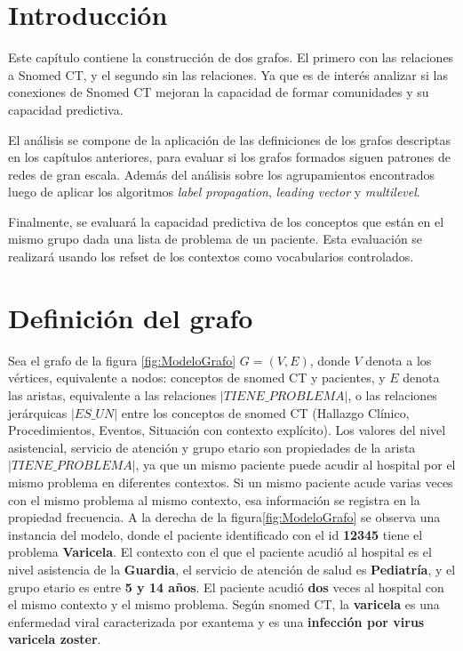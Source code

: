 \section{Introducción}
Este capítulo contiene la construcción de dos grafos. El primero con las relaciones a Snomed CT, y el segundo sin las relaciones. Ya que es de interés analizar si las conexiones de Snomed CT mejoran la capacidad de formar comunidades y su capacidad predictiva.

El análisis se compone de la aplicación de las definiciones de los grafos descriptas en los capítulos anteriores, para evaluar si los grafos formados siguen patrones de redes de gran escala. Además del análisis sobre los agrupamientos encontrados luego de aplicar los algoritmos \textit{label propagation}, \textit{leading vector} y \textit{multilevel}. 

Finalmente, se evaluará la capacidad predictiva de los conceptos que están en el mismo grupo dada una lista de problema de un paciente. Esta evaluación se realizará usando los {\acrshort{refset}} de los contextos como vocabularios controlados.

\section{Definición del grafo}
Sea el grafo de la figura \ref{fig:ModeloGrafo} $G=(V,E)$, donde $V$ denota a los vértices, equivalente a nodos: conceptos de snomed CT y pacientes, y $E$ denota las aristas, equivalente a las relaciones $|\textit{TIENE\_PROBLEMA}|$, o las relaciones jerárquicas $|\textit{ES\_UN}|$ entre los conceptos de snomed CT (Hallazgo Clínico, Procedimientos, Eventos, Situación con contexto explícito). Los valores del nivel asistencial, servicio de atención  y grupo etario son propiedades de la arista $|\textit{TIENE\_PROBLEMA}|$, ya que un mismo paciente puede acudir al hospital por el mismo problema en diferentes contextos.  Si un mismo paciente acude varias veces con el mismo problema al mismo contexto, esa información se registra en la propiedad frecuencia. A la derecha de la figura\ref{fig:ModeloGrafo} se observa una instancia del modelo, donde el paciente identificado con el id \textbf{12345} tiene el problema \textbf{Varicela}. El contexto con el que el paciente acudió al hospital es el nivel asistencia de la \textbf{Guardia}, el servicio de atención de salud es \textbf{Pediatría}, y el grupo etario es entre \textbf{5 y 14 años}. El paciente acudió \textbf{dos} veces al hospital con el mismo contexto y el mismo problema. Según snomed CT, la \textbf{varicela} es una {enfermedad viral caracterizada por exantema} y es una \textbf{infección por virus varicela zoster}.

